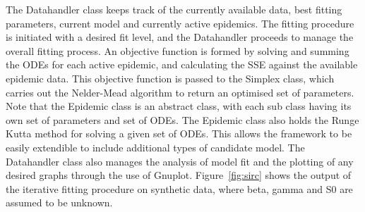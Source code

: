 The Datahandler class keeps track of the currently available data,
best fitting parameters, current model and currently active
epidemics. The fitting procedure is initiated with a desired fit
level, and the Datahandler proceeds to manage the overall fitting
process. An objective function is formed by solving and summing the
ODEs for each active epidemic, and calculating the SSE against the
available epidemic data. This objective function is passed to the
Simplex class, which carries out the Nelder-Mead algorithm to return
an optimised set of parameters. Note that the Epidemic class is an
abstract class, with each sub class having its own set of parameters
and set of ODEs. The Epidemic class also holds the Runge Kutta method
for solving a given set of ODEs. This allows the framework to be easily extendible to
include additional types of candidate model. The Datahandler class
also manages the analysis of model fit and the plotting of any desired
graphs through the use of Gnuplot. Figure~\ref{fig:sirc} shows the output of the
iterative fitting procedure on synthetic data, where beta, gamma and
S0 are assumed to be unknown.

